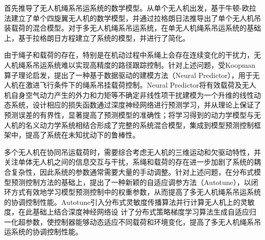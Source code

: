 首先推导了无人机绳系吊运系统的数学模型。从单个无人机出发，基于牛顿-欧拉法建立了单个四旋翼无人机的数学模型，并通过拉格朗日法推导出了单个无人机吊装载荷的混合模型。对于多无人机绳系吊运系统，在单无人机绳系吊运系统的基础上，基于拉格朗日方程建立了系统的模型，并进行了简化。

由于绳子和载荷的存在，特别是在机动过程中系绳上会存在连续变化的干扰力，无人机绳系吊运系统难以实现高精度的路径跟踪控制。针对上述问题，受Koopman算子理论启发，提出了一种基于数据驱动的建模方法（Neural Predictor），用于无人机在激进飞行条件下的绳系吊挂载荷控制。Neural Predictor将有效载荷及无人机自身空气动力产生的外力和力矩等不确定非线性项干扰建模为一个升维的线性动态系统，设计相应的损失函数通过深度神经网络进行预测学习，并从理论上保证了预测误差的有界性，显著提高了预测模型的准确性；将学习得到的动力学模型与无人机的名义动力学系统相结合形成了完整的系统混合模型，集成到模型预测控制框架中，提高了系统在未知扰动下的鲁棒性。

多个无人机在协同吊运载荷时，需要综合考虑无人机的三维运动和欠驱动特性，并关注单体无人机之间的信息交互与干扰，系绳和载荷的存在进一步加剧了系统的耦合复杂性，因此系统的参数通常需要大量的手动调整。针对上述问题，在分布式模型预测控制方法的基础上，提出了一种新颖的自适应调参方法（Autotune），以闭环方式有效地学习模型预测控制中的权重参数，从而提高了多无人机绳系吊运系统的协调控制性能。Autotune引入分布式灵敏度传播算法并行计算无人机上的灵敏度，在此基础上结合深度神经网络设
计了分布式策略梯度学习算法生成自适应归一化超参数，使控制器能够动态适应不同载荷和环境变化，提高了多无人机绳系吊运系统的协调控制性能。